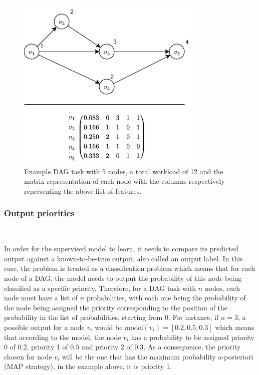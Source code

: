 \begin{figure}
    \centering
    \includegraphics[width=\linewidth]{images/dag_matrix_example.drawio.png}
    \caption{Example DAG task with 5 nodes, a total workload of 12
    and the matrix representation of each node with the columns respectively representing the above list of features.}
    \label{fig:dag_task_matrix_example}
\end{figure}

\subsubsection{Output priorities}
~
\label{sec:output_labels}

In order for the supervised model to learn, it needs to 
compare its predicted output against a known-to-be-true output, also 
called an output label. In this case,
the problem is treated as a classification problem which means 
that for each node of a DAG, the model needs to output the probability
of this node being classified as a specific priority.
Therefore, for a DAG task with $n$ nodes,
each node must have a list of $n$ probabilities,
with each one being the probability of the node being 
assigned the priority corresponding to the position of the probability in the list
of probabilities, starting from 0.
For instance, if $n = 3$, 
a possible output for a node $v_i$ would be
$\text{model}(v_i) = [0.2,0.5,0.3]$ which means that according to the model,
the node $v_i$ has a probability to be assigned priority 0 of $0.2$,
priority 1 of $0.5$ and priority 2 of $0.3$.
As a consequence, the priority chosen for node $v_i$ will be 
the one that has the maximum probability a-posteriori (MAP strategy),
in the example above, it is priority 1.

